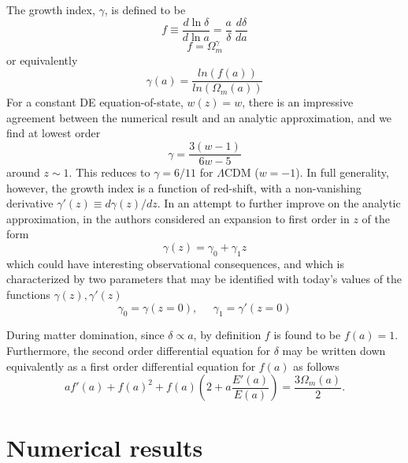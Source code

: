 \documentclass[aps,prd,amsmath,amssymb]{revtex4}
\begin{document}
The growth index, $\gamma$, is defined to be
%
\begin{equation}
f \equiv \frac{d \ln \delta}{d \ln a} = \frac{a}{\delta} \: \frac{d \delta}{d a}
\end{equation}
%
\begin{equation}
f = \Omega_m^\gamma
\end{equation}
%
or equivalently
%
\begin{equation}
\gamma(a) = \frac{ln(f(a))}{ln(\Omega_m(a))}
\end{equation}
%
For a constant DE equation-of-state, $w(z)=w$, there is an impressive agreement between the numerical result and an 
analytic approximation, and we find at lowest order \cite{leandros2}
\begin{equation}
\gamma = \frac{3(w-1)}{6w-5}
\end{equation}
around $z \sim 1$. This reduces to $\gamma=6/11$ for $\Lambda$CDM ($w=-1$). In full generality, however, the growth index is a function of red-shift, with a non-vanishing derivative $\gamma'(z) \equiv d\gamma(z)/dz$. In an attempt to further improve on the analytic approximation, in \cite{radouane,leandros2} the authors considered an expansion to first order in $z$ of the form
\begin{equation}
\gamma(z) = \gamma_0 + \gamma_1 z
\end{equation}
which could have interesting observational consequences, and which is characterized by two parameters that may be identified with today's values of the functions $\gamma(z),\gamma'(z)$
\begin{equation}
\gamma_0 = \gamma(z=0), \;\;\;\;\;  \gamma_1 = \gamma'(z=0)
\end{equation}

During matter domination, since $\delta \propto a$, by definition $f$ is found to be $f(a)=1$. Furthermore, the second order differential equation for $\delta$ may be written down equivalently as a first order differential equation for $f(a)$
as follows
\begin{equation}
a f'(a) + f(a)^2 + f(a) \left( 2 + a \frac{E'(a)}{E(a)} \right) = \frac{3 \Omega_m(a)}{2}.
\end{equation}



\section{Numerical results}
\end{document}
